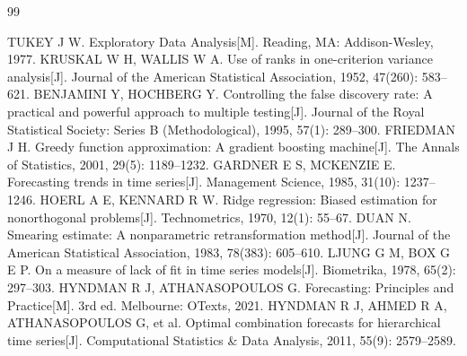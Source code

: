 \begin{thebibliography}{99}

 TUKEY J W. Exploratory Data Analysis[M]. Reading, MA: Addison-Wesley, 1977.
 KRUSKAL W H, WALLIS W A. Use of ranks in one-criterion variance analysis[J]. Journal of the American Statistical Association, 1952, 47(260): 583--621.
 BENJAMINI Y, HOCHBERG Y. Controlling the false discovery rate: A practical and powerful approach to multiple testing[J]. Journal of the Royal Statistical Society: Series B (Methodological), 1995, 57(1): 289--300.
 FRIEDMAN J H. Greedy function approximation: A gradient boosting machine[J]. The Annals of Statistics, 2001, 29(5): 1189--1232.
 GARDNER E S, MCKENZIE E. Forecasting trends in time series[J]. Management Science, 1985, 31(10): 1237--1246.
 HOERL A E, KENNARD R W. Ridge regression: Biased estimation for nonorthogonal problems[J]. Technometrics, 1970, 12(1): 55--67.
 DUAN N. Smearing estimate: A nonparametric retransformation method[J]. Journal of the American Statistical Association, 1983, 78(383): 605--610.
 LJUNG G M, BOX G E P. On a measure of lack of fit in time series models[J]. Biometrika, 1978, 65(2): 297--303.
 HYNDMAN R J, ATHANASOPOULOS G. Forecasting: Principles and Practice[M]. 3rd ed. Melbourne: OTexts, 2021.
 HYNDMAN R J, AHMED R A, ATHANASOPOULOS G, et al. Optimal combination forecasts for hierarchical time series[J]. Computational Statistics \& Data Analysis, 2011, 55(9): 2579--2589.

\end{thebibliography}
